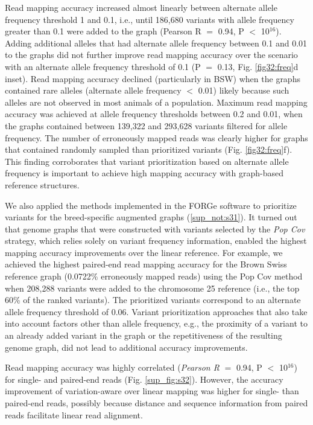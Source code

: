 \documentclass[../main.tex]{subfiles}
\begin{document}
Read mapping accuracy increased almost linearly between alternate allele frequency threshold 1 and 0.1, i.e., until 186,680 variants with allele frequency greater than 0.1 were added to the graph (Pearson R $=$ 0.94, P $<$ 10$^{16}$). Adding additional alleles that had alternate allele frequency between 0.1 and 0.01 to the graphs did not further improve read mapping accuracy over the scenario with an alternate allele frequency threshold of 0.1 (P $=$ 0.13, Fig. \ref{fig32:freq}d inset). Read mapping accuracy declined (particularly in BSW) when the graphs contained rare alleles (alternate allele frequency $<$ 0.01) likely because such alleles are not observed in most animals of a population. Maximum read mapping accuracy was achieved at allele frequency thresholds between 0.2 and 0.01, when the graphs contained between 139,322 and 293,628 variants filtered for allele frequency. The number of erroneously mapped reads was clearly higher for graphs that contained randomly sampled than prioritized variants (Fig. \ref{fig32:freq}f). This finding corroborates that variant prioritization based on alternate allele frequency is important to achieve high mapping accuracy with graph-based reference structures.

We also applied the methods implemented in the FORGe software \citep{pritt2018forge} to prioritize variants for the breed-specific augmented graphs (\ref{sup_not:s31}). It turned out that genome graphs that were constructed with variants selected by the \emph{Pop Cov} strategy, which relies solely on variant frequency information, enabled the highest mapping accuracy improvements over the linear reference. For example, we achieved the highest paired-end read mapping accuracy for the Brown Swiss reference graph (0.0722\% erroneously mapped reads) using the Pop Cov method when 208,288 variants were added to the chromosome 25 reference (i.e., the top 60\% of the ranked variants). The prioritized variants correspond to an alternate allele frequency threshold of 0.06. Variant prioritization approaches that also take into account factors other than allele frequency, e.g., the proximity of a variant to an already added variant in the graph or the repetitiveness of the resulting genome graph, did not lead to additional accuracy improvements.

Read mapping accuracy was highly correlated (\emph{Pearson R} $=$ 0.94, P $<$ 10$^{16}$) for single- and paired-end reads (Fig. \ref{sup_fig:s32}). However, the accuracy improvement of variation-aware over linear mapping was higher for single- than paired-end reads, possibly because distance and sequence information from paired reads facilitate linear read alignment.
\end{document}
